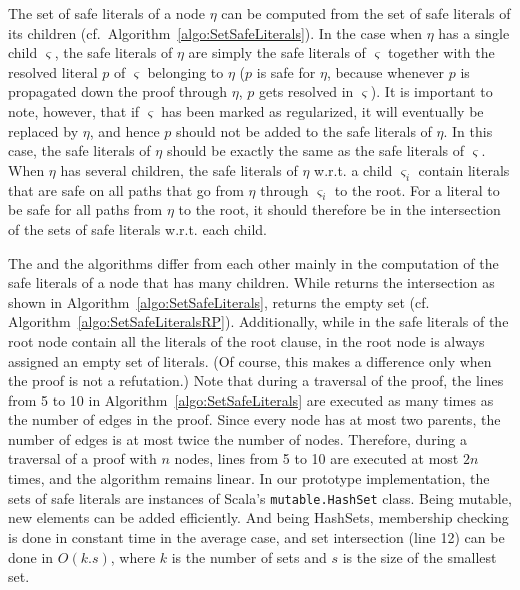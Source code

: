 The set of safe literals of a node $\eta$ can be computed from the set of safe literals of its children (cf.\ Algorithm~\ref{algo:SetSafeLiterals}). 
In the case when $\eta$ has a single child $\varsigma$, the safe literals of $\eta$ are simply the safe literals of $\varsigma$ together with the resolved literal $p$ of $\varsigma$ belonging to $\eta$ ($p$ is safe for $\eta$, because whenever $p$ is propagated down the proof through $\eta$, $p$ gets resolved in $\varsigma$). 
It is important to note, however, that if $\varsigma$ has been marked as regularized, it will eventually be replaced by $\eta$, and hence $p$ should not be added to the safe literals of $\eta$. 
In this case, the safe literals of $\eta$ should be exactly the same as the safe literals of $\varsigma$.
When $\eta$ has several children, the safe literals of $\eta$ w.r.t. a child $\varsigma_i$ contain literals that are safe on all paths that go from $\eta$ through $\varsigma_i$ to the root. 
For a literal to be safe for all paths from $\eta$ to the root, it should therefore be in the intersection of the sets of safe literals w.r.t. each child.

The {\RP} and the {\RPI} algorithms differ from each other mainly in the computation of the safe literals of a node that has many children. 
While {\RPI} returns the intersection as shown in Algorithm~\ref{algo:SetSafeLiterals}, {\RP} returns the empty set (cf. Algorithm~\ref{algo:SetSafeLiteralsRP}). 
Additionally, while in {\RPI} the safe literals of the root node contain all the literals of the root clause, in {\RP} the root node is always assigned an empty set of literals. 
(Of course, this makes a difference only when the proof is not a refutation.)
Note that during a traversal of the proof, 
the lines from 5 to 10 in Algorithm~\ref{algo:SetSafeLiterals} are executed as many times as the number of edges in the proof. 
Since every node has at most two parents, the number of edges is at most twice the number of nodes. 
Therefore, during a traversal of a proof with $n$ nodes, lines from 5 to 10 are executed at most $2n$ times, and the algorithm remains linear.
In our prototype implementation, the sets of safe literals are instances of Scala's \texttt{mutable.HashSet} class. 
Being mutable, new elements can be added efficiently.
And being HashSets, membership checking is done in constant time in the average case,  and set intersection (line 12) can be done in $O(k.s)$, where $k$ is the number of sets and $s$ is the size of the smallest set.

